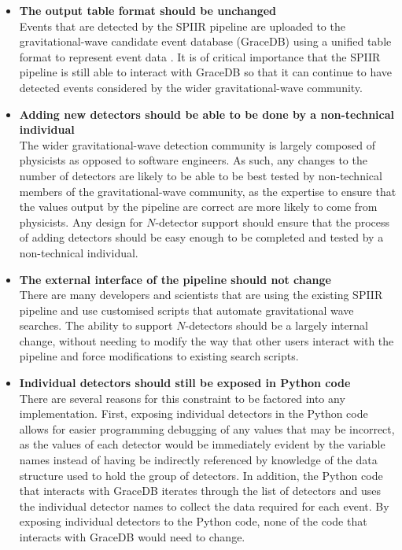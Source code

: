\documentclass{article}
\begin{document}
\begin{itemize}
    \item \textbf{The output table format should be unchanged}\\
        Events that are detected by the SPIIR pipeline are uploaded to the gravitational-wave candidate event database (GraceDB) using a unified table format to represent event data \cite{gracedb}.
        It is of critical importance that the SPIIR pipeline is still able to interact with GraceDB so that it can continue to have detected events considered by the wider gravitational-wave community.
    \item \textbf{Adding new detectors should be able to be done by a non-technical individual}\\
        The wider gravitational-wave detection community is largely composed of physicists as opposed to software engineers.
        As such, any changes to the number of detectors are likely to be able to be best tested by non-technical members of the gravitational-wave community, as the expertise to ensure that the values output by the pipeline are correct are more likely to come from physicists.
        Any design for \(N\)-detector support should ensure that the process of adding detectors should be easy enough to be completed and tested by a non-technical individual.
    \item \textbf{The external interface of the pipeline should not change}\\
        There are many developers and scientists that are using the existing SPIIR pipeline and use customised scripts that automate gravitational wave searches.
        The ability to support \(N\)-detectors should be a largely internal change, without needing to modify the way that other users interact with the pipeline and force modifications to existing search scripts.
    \item \textbf{Individual detectors should still be exposed in Python code}\\
        There are several reasons for this constraint to be factored into any implementation.
        First, exposing individual detectors in the Python code allows for easier programming debugging of any values that may be incorrect, as the values of each detector would be immediately evident by the variable names instead of having be indirectly referenced by knowledge of the data structure used to hold the group of detectors.
        In addition, the Python code that interacts with GraceDB iterates through the list of detectors and uses the individual detector names to collect the data required for each event.
        By exposing individual detectors to the Python code, none of the code that interacts with GraceDB would need to change.
\end{itemize}
\end{document}

